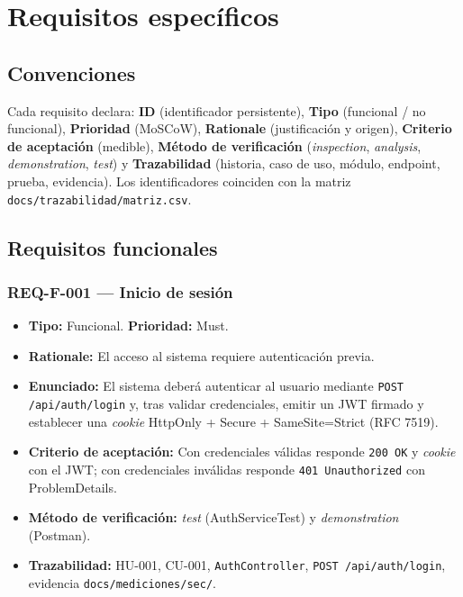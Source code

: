 \documentclass[12pt,a4paper]{article}
\begin{document}
\section{Requisitos específicos}
\label{sec:requisitos}

\subsection{Convenciones}
\label{sec:convenciones}

Cada requisito declara: \textbf{ID} (identificador persistente), \textbf{Tipo} (funcional /
no funcional), \textbf{Prioridad} (MoSCoW), \textbf{Rationale} (justificación y origen),
\textbf{Criterio de aceptación} (medible), \textbf{Método de verificación}
(\textit{inspection}, \textit{analysis}, \textit{demonstration}, \textit{test}) y
\textbf{Trazabilidad} (historia, caso de uso, módulo, endpoint, prueba, evidencia). Los
identificadores coinciden con la matriz \texttt{docs/trazabilidad/matriz.csv}.

\subsection{Requisitos funcionales}
\label{sec:rf}

\subsubsection{REQ-F-001 — Inicio de sesión}
\begin{itemize}
  \item \textbf{Tipo:} Funcional. \textbf{Prioridad:} Must.
  \item \textbf{Rationale:} El acceso al sistema requiere autenticación previa.
  \item \textbf{Enunciado:} El sistema deberá autenticar al usuario mediante
  \texttt{POST /api/auth/login} y, tras validar credenciales, emitir un JWT firmado y
  establecer una \textit{cookie} HttpOnly + Secure + SameSite=Strict (RFC 7519).
  \item \textbf{Criterio de aceptación:} Con credenciales válidas responde \texttt{200 OK} y
  \textit{cookie} con el JWT; con credenciales inválidas responde \texttt{401 Unauthorized}
  con ProblemDetails.
  \item \textbf{Método de verificación:} \textit{test} (AuthServiceTest) y
  \textit{demonstration} (Postman).
  \item \textbf{Trazabilidad:} HU-001, CU-001, \texttt{AuthController},
  \texttt{POST /api/auth/login}, evidencia \texttt{docs/mediciones/sec/}.
\end{itemize}
\end{document}
